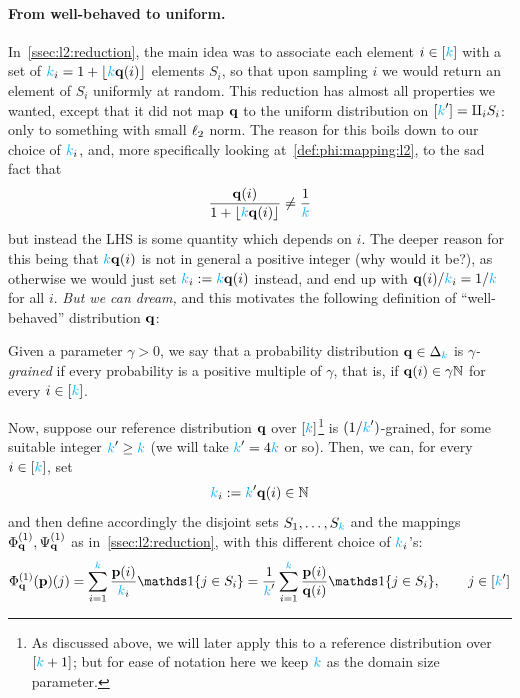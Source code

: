 \paragraph{From well-behaved to uniform.} In~\cref{ssec:l2:reduction}, the main idea was to associate each element $i\in[\ab]$ with a set of $\ab_i=1+\flr{\ab\q(i)}$ elements $S_i$, so that upon sampling $i$ we would return an element of $S_i$ uniformly at random. This reduction has almost all properties we wanted, except that it did not map $\q$ to the uniform distribution on $[\ab'] = \disjunion_i S_i$: only to something with small $\lp[2]$ norm. The reason for this boils down to our choice of $\ab_i$, and, more specifically looking at~\cref{def:phi:mapping:l2}, to the sad fact that
\[
	\frac{\q(i)}{1+\flr{\ab\q(i)}} \neq \frac{1}{\ab}
\]
but instead the LHS is some quantity which depends on $i$. The deeper reason for this being that $\ab\q(i)$ is not in general a positive integer  (why would it be?), as otherwise we would just set $\ab_i \eqdef \ab\q(i)$ instead, and end up with $\q(i)/\ab_i = 1/\ab$ for all $i$. \emph{But we can dream,} and this motivates the following definition of ``well-behaved'' distribution $\q$:
\begin{definition}
Given a parameter $\gamma>0$, we say that a probability distribution $\q\in\distribs{\ab}$ is \emph{$\gamma$-grained} if every probability is a positive multiple of $\gamma$, that is, if $\q(i)\in \gamma\N$ for every $i\in[\ab]$.
\end{definition}
Now, suppose our reference distribution $\q$ over $[\ab]$\footnote{As discussed above, we will later apply this to a reference distribution over $[\ab+1]$; but for ease of notation here we keep $\ab$ as the domain size parameter.} is $(1/\ab')$-grained, for some suitable integer $\ab'\geq \ab$ (we will take $\ab'=4\ab$ or so). Then, we can, for every $i\in[\ab]$, set
\begin{equation}
	\label{eq:l1:reduction:ki}
	\ab_i \eqdef \ab'\q(i) \in\N
\end{equation}
and then define accordingly the disjoint sets $S_1,\dots,S_\ab$ and the mappings $\Phi^{(1)}_\q,\Psi^{(1)}_\q$ as in~\cref{ssec:l2:reduction}, with this different choice of $\ab_i$'s:
\begin{equation}
	\label{def:phi:mapping:l1:grained}
	\Phi^{(1)}_\q(\p)(j) = \sum_{i=1}^\ab \frac{\p(i)}{\ab_i} \indic{ j\in S_i } = \frac{1}{\ab'}\sum_{i=1}^\ab \frac{\p(i)}{\q(i)} \indic{ j\in S_i }, \qquad j \in [\ab']
\end{equation}
